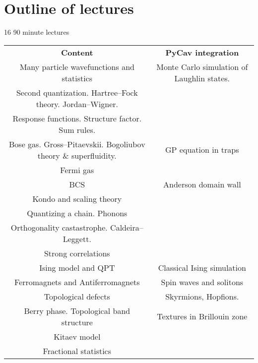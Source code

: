 \section{Outline of lectures}

16 90 minute lectures

\begin{table} 
    \begin{tabular}{ c | c }
     \textbf{Content}   & \textbf{PyCav integration}  \\ 
       Many particle wavefunctions and statistics 
   & Monte Carlo simulation of Laughlin states. \\ 
      Second quantization. Hartree--Fock theory. Jordan--Wigner.  &  \\ 
      Response functions. Structure factor. Sum rules.    &  \\ 
      Bose gas. Gross--Pitaevskii. Bogoliubov theory \& superfluidity.   & GP equation in traps \\ 
      Fermi gas   &  \\ 
      BCS   & Anderson domain wall  \\ 
      Kondo and scaling theory   &  \\ 
      Quantizing a chain. Phonons   &  \\ 
      Orthogonality castastrophe. Caldeira--Leggett.   &  \\ 
      Strong correlations   &  \\ 
      Ising model and QPT   &  Classical Ising simulation \\ 
      Ferromagnets and Antiferromagnets   & Spin waves and solitons \\ 
      Topological defects   & Skyrmions, Hopfions. \\ 
      Berry phase. Topological band structure   & Textures in Brillouin zone \\ 
      Kitaev model   &  \\ 
      Fractional statistics & 
    \end{tabular} 
\end{table}

